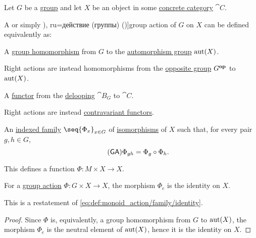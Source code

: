 \begin{definition}\label{def:group_action}
  Let \( G \) be a \hyperref[def:group]{group} and let \( X \) be an object in some \hyperref[def:concrete_category]{concrete category} \( \cat{C} \).

  A  or simply \term[bg=действие (на група) (\cite[def. IV.18]{ГеновМиховскиМоллов1991Алгебра}), ru=действие (группы) (\cite[def. 10.3.1]{Винберг2014Алгебра})]{group action} of \( G \) on \( X \) can be defined equivalently as:
  \begin{thmenum}
     A \hyperref[def:group/homomorphism]{group homomorphism} from \( G \) to the \hyperref[def:automorphism_group]{automorphism group} \( \operatorname{aut}(X) \).

    Right actions are instead homomorphisms from the \hyperref[def:group/opposite]{opposite group} \( G^\oppos \) to \( \operatorname{aut}(X) \).

     A \hyperref[def:functor]{functor} from the \hyperref[def:monoid_delooping]{delooping} \( \cat{B}_G \) to \( \cat{C} \).

    Right actions are instead \hyperref[rem:contravariant_functor]{contravariant functors}.

     An \hyperref[def:indexed_family]{indexed family} \( \seq{ \Phi_x }_{x \in G} \) of \hyperref[def:morphism_invertibility/isomorphism]{isomorphisms} of \( X \) such that, for every pair \( g, h \in G \),
    \begin{equation}\label{eq:def:group_action/family/compatibility}\tag{\logic{GA}}
      \Phi_{gh} = \Phi_g \bincirc \Phi_h.
    \end{equation}

    This defines a function \( \Phi: M \times X \to X \).
  \end{thmenum}
\end{definition}

\begin{proposition}\label{thm:group_action_of_neutral_element}
  For a \hyperref[def:group_action]{group action} \( \Phi: G \times X \to X \), the morphism \( \Phi_e \) is the identity on \( X \).
\end{proposition}
\begin{comments}
  \item This is a restatement of \eqref{eq:def:monoid_action/family/identity}.
\end{comments}
\begin{proof}
  Since \( \Phi \) is, equivalently, a group homomorphism from \( G \) to \( \operatorname{aut}(X) \), the morphism \( \Phi_e \) is the neutral element of \( \operatorname{aut}(X) \), hence it is the identity on \( X \).
\end{proof}

